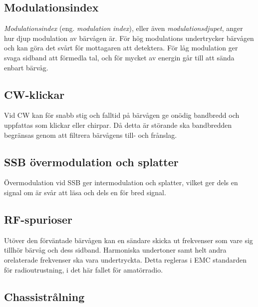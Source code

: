 \subsection{Modulationsindex}

\emph{Modulationsindex} (eng. \emph{modulation index}), eller även
\emph{modulationsdjupet}, anger hur djup modulation av bärvågen är.
För hög modulations undertrycker bärvågen och kan göra det svårt för
mottagaren att detektera.
För låg modulation ger svaga sidband att förmedla tal, och för mycket
av energin går till att sända enbart bärvåg.

\subsection{CW-klickar}
\label{cw-klickar}

Vid CW kan för snabb stig och falltid på bärvågen ge onödig bandbredd och
uppfattas som klickar eller chirpar. Då detta är störande ska bandbredden
begränsas genom att filtrera bärvågens till- och frånslag.

\subsection{SSB övermodulation och splatter}
\label{splatter}

Övermodulation vid SSB ger intermodulation och splatter, vilket ger dels en
signal om är svår att läsa och dels en för bred signal.

\subsection{RF-spurioser}

Utöver den förväntade bärvågen kan en sändare skicka ut frekvenser som vare
sig tillhör bärvåg och dess sidband. Harmoniska undertoner samt helt andra
orelaterade frekvenser ska vara undertryckta.
Detta regleras i EMC standarden för radioutrustning, i det här fallet för
amatörradio.

\subsection{Chassistrålning}

